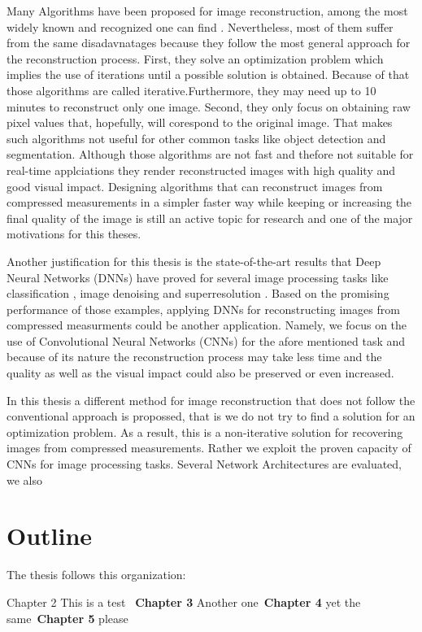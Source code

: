 Many Algorithms have been proposed for image reconstruction, among the most widely known and recognized one can find \cite{metzler2014denoising,dong2014compressive, li2013efficient,mun2009block,chen2011compressed,fowler2011multiscale}. Nevertheless, most of them suffer from the same disadavnatages because they follow the most general approach for the reconstruction process. First, they solve an optimization problem which implies the use of iterations until a possible solution is obtained. Because of that those algorithms are called iterative.Furthermore, they may need up to 10 minutes to reconstruct only one image. Second, they only focus on obtaining raw pixel values that, hopefully, will corespond to the original image. That makes such algorithms not useful for other common tasks like object detection and segmentation. Although those algorithms are not fast and thefore not suitable for real-time applciations they render reconstructed images with high quality and good visual impact. Designing algorithms that can reconstruct images from compressed measurements in a simpler faster way while keeping or increasing the final quality of the image is still an active topic for research and one of the major motivations for this theses. \

Another justification for this thesis is the state-of-the-art results that Deep Neural Networks (DNNs) \cite{lecun2015deep} have proved for several image processing tasks like classification \cite{krizhevsky2012imagenet}, image denoising \cite{burger2012image} and superresolution \cite{dong2014learning}. Based on the promising performance of those examples, applying DNNs for reconstructing images from compressed measurments could be another application. Namely, we focus on the use of Convolutional Neural Networks (CNNs) for the afore mentioned task and because of its nature the reconstruction process may take less time and the quality as well as the visual impact could also be preserved or even increased.  

In this thesis a different method for image reconstruction that does not follow the conventional approach is propossed, that is we do not try to find a solution for an optimization problem. As a result, this is a non-iterative solution for recovering images from compressed measurements. Rather we exploit the proven capacity of CNNs for image processing tasks. Several Network Architectures are evaluated, we also 

\section{Outline}
The thesis follows this organization: \

\bm Chapter 2 This is a test \
{\bfseries Chapter 3} Another one\
{\bfseries Chapter 4} yet the same\
{\bfseries Chapter 5} please \

